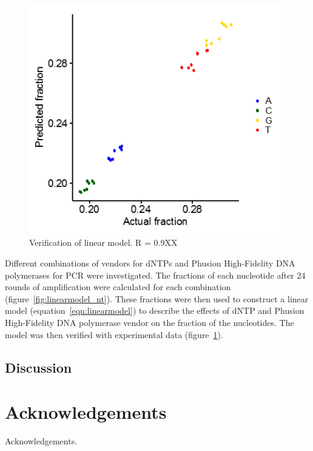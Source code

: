 \documentclass[parskip=full, numbers=noenddot]{scrreprt}
\begin{document}
\begin{figure}[htpb]
  \centering
  \includegraphics[width=\textwidth]{linearmodel_plot}
  \caption{Verification of linear model. R = 0.9XX}
  \label{fig:linearmodel_ver}
\end{figure}

Different combinations of vendors for dNTPs and Phusion High-Fidelity DNA polymerases for PCR were investigated.  The fractions of each nucleotide after 24 rounds of amplification were calculated for each combination (figure~\ref{fig:linearmodel_nt}).  These fractions were then used to construct a linear model (equation~\ref{eqn:linearmodel}) to describe the effects of dNTP and Phusion High-Fidelity DNA polymerase vendor on the fraction of the nucleotides. The model was then verified with experimental data (figure~\ref{fig:linearmodel_ver}).

\section{Discussion}
\label{sec:pcrbias_discussion}

\chapter{Acknowledgements}
\label{ch:ack}

Acknowledgements.

\printbibliography
\end{document}
